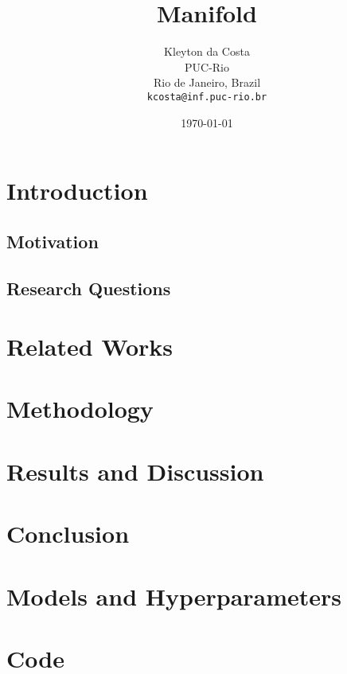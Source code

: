 \documentclass{article}
\title{Manifold}
\date{\today}
\author{
  Kleyton da Costa \\
  PUC-Rio \\
  Rio de Janeiro, Brazil\\
  \texttt{kcosta@inf.puc-rio.br} \\
}
\begin{document}
\maketitle
	
\begin{abstract}
  
\end{abstract}
	
	
\section{Introduction}

\subsection{Motivation}

\subsection{Research Questions}


\section{Related Works}




\section{Methodology}


\section{Results and Discussion}



\section{Conclusion}


\appendix

\section{Models and Hyperparameters}


\section{Code}
\end{document}
